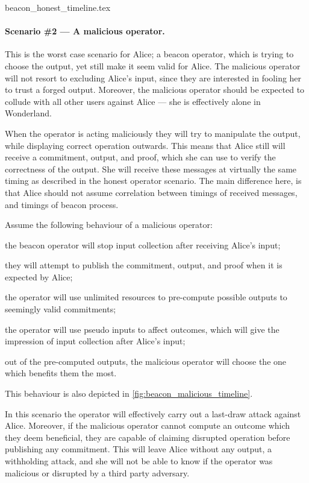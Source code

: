 {beacon_honest_timeline.tex}

\paragraph{Scenario \#2 --- A malicious operator.}
This is the worst case scenario for Alice; a beacon operator, which is trying to choose the output, yet still make it seem valid for Alice.
The malicious operator will not resort to excluding Alice's input, since they are interested in fooling her to trust a forged output.
Moreover, the malicious operator should be expected to collude with all other users against Alice --- she is effectively alone in Wonderland.

When the operator is acting maliciously they will try to manipulate the output, while displaying correct operation outwards.
This means that Alice still will receive a commitment, output, and proof, which she can use to verify the correctness of the output.
She will receive these messages at virtually the same timing as described in the honest operator scenario.
The main difference here, is that Alice should not assume correlation between timings of received messages, and timings of beacon process.

Assume the following behaviour of a malicious operator:
\begin{eletterate*}
\item the beacon operator will stop input collection after receiving Alice's input;
\item they will attempt to publish the commitment, output, and proof when it is expected by Alice;
\item the operator will use unlimited resources to pre-compute possible outputs to seemingly valid commitments;
\item the operator will use pseudo inputs to affect outcomes, which will give the impression of input collection after Alice's input;
\item out of the pre-computed outputs, the malicious operator will choose the one which benefits them the most.
\end{eletterate*}
This behaviour is also depicted in \cref{fig:beacon_malicious_timeline}.

In this scenario the operator will effectively carry out a last-draw attack against Alice.
Moreover, if the malicious operator cannot compute an outcome which they deem beneficial, they are capable of claiming disrupted operation before publishing any commitment.
This will leave Alice without any output, a withholding attack, and she will not be able to know if the operator was malicious or disrupted by a third party adversary.

